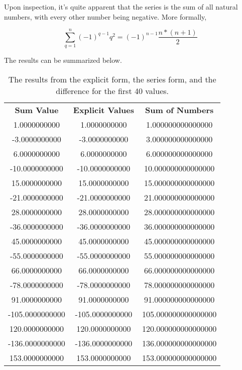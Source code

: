 \documentclass[12pt]{scrartcl}
\begin{document}
\problem{}
Upon inspection, it's quite apparent that the series is the sum of all natural numbers, with every other number being negative. More formally,

\begin{equation*}
    \sum_{q=1}^n {(-1)}^{q - 1} q^2 = {(-1)}^{n - 1} \frac{n*(n + 1)}{2}
\end{equation*}

The results can be summarized below.

\begin{table}[H]
    \centering
    \caption{The results from the explicit form, the series form, and the difference for the first \num{40} values.}
    \begin{tabular}{ccc}
        \textbf{Sum Value}    & \textbf{Explicit Values} & \textbf{Sum of Numbers}  \\
        1.0000000000    & 1.0000000000    & 1.000000000000000 \\
        -3.0000000000   & -3.0000000000   & 3.000000000000000 \\
        6.0000000000    & 6.0000000000    & 6.000000000000000 \\
        -10.0000000000  & -10.0000000000  & 10.000000000000000 \\
        15.0000000000   & 15.0000000000   & 15.000000000000000 \\
        -21.0000000000  & -21.0000000000  & 21.000000000000000 \\
        28.0000000000   & 28.0000000000   & 28.000000000000000 \\
        -36.0000000000  & -36.0000000000  & 36.000000000000000 \\
        45.0000000000   & 45.0000000000   & 45.000000000000000 \\
        -55.0000000000  & -55.0000000000  & 55.000000000000000 \\
        66.0000000000   & 66.0000000000   & 66.000000000000000 \\
        -78.0000000000  & -78.0000000000  & 78.000000000000000 \\
        91.0000000000   & 91.0000000000   & 91.000000000000000 \\
        -105.0000000000 & -105.0000000000 & 105.000000000000000 \\
        120.0000000000  & 120.0000000000  & 120.000000000000000 \\
        -136.0000000000 & -136.0000000000 & 136.000000000000000 \\
        153.0000000000  & 153.0000000000  & 153.000000000000000 \\

\end{tabular}
\end{table}
\end{document}
